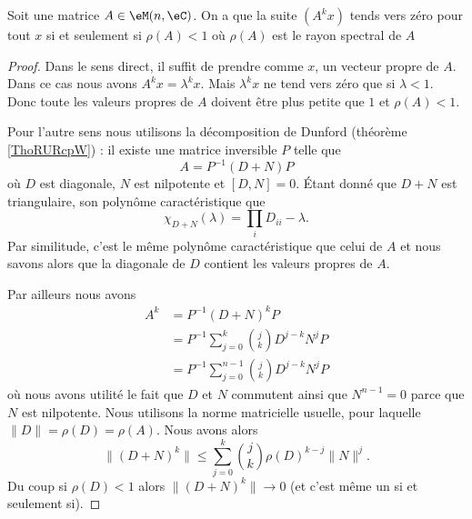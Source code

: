 \begin{theorem}
    Soit une matrice \( A\in \eM(n,\eC)\). On a que la suite \( (A^kx)\) tends vers zéro pour tout \( x\) si et seulement si \( \rho(A)<1\) où \( \rho(A)\) est le rayon spectral de $A$
\end{theorem}

\begin{proof}
    Dans le sens direct, il suffit de prendre comme \( x\), un vecteur propre de \( A\). Dans ce cas nous avons \( A^kx=\lambda^kx\). Mais \( \lambda^kx\) ne tend vers zéro que si \( \lambda<1\). Donc toute les valeurs propres de \( A\) doivent être plus petite que \( 1\) et \( \rho(A)<1\).

    Pour l'autre sens nous utilisons la décomposition de Dunford (théorème \ref{ThoRURcpW}) : il existe une matrice inversible \( P\) telle que
    \begin{equation}
        A=P^{-1}(D+N)P
    \end{equation}
    où \( D\) est diagonale, \( N\) est nilpotente et \( [D,N]=0\). Étant donné que \( D+N\) est triangulaire, son polynôme caractéristique que
    \begin{equation}
        \chi_{D+N}(\lambda)=\prod_i D_{ii}-\lambda.
    \end{equation}
    Par similitude, c'est le même polynôme caractéristique que celui de \( A\) et nous savons alors que la diagonale de \( D\) contient les valeurs propres de \( A\).

    Par ailleurs nous avons
    \begin{subequations}
        \begin{align}
            A^k&=P^{-1}(D+N)^kP\\
            &=P^{-1}\sum_{j=0}^k{j\choose k}D^{j-k}N^jP\\
            &=P^{-1}\sum_{j=0}^{n-1}{j\choose k}D^{j-k}N^jP
        \end{align}
    \end{subequations}
    où nous avons utilité le fait que \( D\) et \( N\) commutent ainsi que \( N^{n-1}=0\) parce que \( N\) est nilpotente. Nous utilisons la norme matricielle usuelle, pour laquelle \( \| D \|=\rho(D)=\rho(A)\). Nous avons alors
    \begin{equation}
        \| (D+N)^k \|\leq \sum_{j=0}^k{j\choose k}\rho(D)^{k-j}\| N \|^j.
    \end{equation}
    Du coup si \( \rho(D)<1\) alors \( \| (D+N)^k \|\to 0\) (et c'est même un si et seulement si).
\end{proof}

